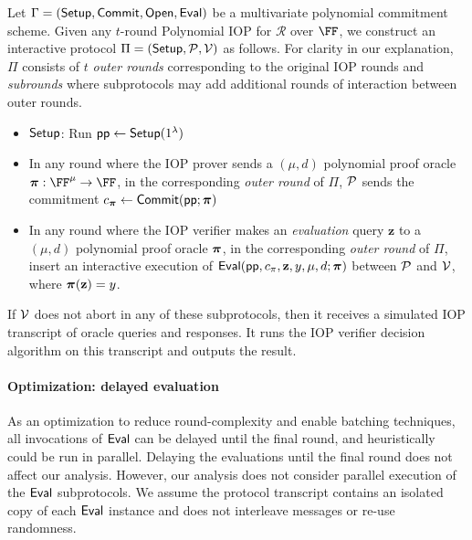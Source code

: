 Let $\Gamma = (\textsf{{Setup}}, \textsf{{Commit}}, \textsf{{Open}}, \textsf{{Eval}})$ be a multivariate polynomial commitment scheme. Given any $t$-round Polynomial IOP for $\mathcal{R}$ over $\FF$, we construct an interactive protocol $\Pi = (\textsf{{Setup}}, \mathcal{P}, \mathcal{V})$ as follows. For clarity in our explanation, $\Pi$ consists of $t$ \emph{outer rounds} corresponding to the original IOP rounds and \emph{subrounds} where subprotocols may add additional rounds of interaction between outer rounds.
\begin{itemize}
\item $\textsf{{Setup}}$: Run $\textsf{pp} \leftarrow \textsf{{Setup}}(1^\lambda)$
\item In any round where the IOP prover sends a $(\mu, d)$ polynomial proof oracle $\proofO: \FF^\mu \rightarrow \FF$, in the corresponding \emph{outer round} of $\Pi$, $\mathcal{P}$ sends the commitment $c_{\boldsymbol{\pi}} \leftarrow \textsf{{Commit}}(\textsf{pp}; \boldsymbol{\pi})$
\item In any round where the IOP verifier makes an \emph{evaluation} query $\mathbf{z}$ to a $(\mu, d)$ polynomial proof oracle $\boldsymbol{\pi}$, in the corresponding \emph{outer round} of $\Pi$, insert an interactive execution of $\textsf{{Eval}}(\textsf{pp}, c_\pi, \mathbf{z}, y, \mu, d; \boldsymbol{\pi})$ between $\mathcal{P}$ and $\mathcal{V}$, where $\boldsymbol{\pi}(\mathbf{z}) = y$. 
\end{itemize}

If $\mathcal{V}$ does not abort in any of these subprotocols, then it receives a simulated IOP transcript of oracle queries and responses. It runs the IOP verifier decision algorithm on this transcript and outputs the result.

\paragraph{Optimization: delayed evaluation} As an optimization to reduce round-complexity and enable batching techniques, all invocations of $\textsf{{Eval}}$ can be delayed until the final round, and heuristically could be run in parallel. Delaying the evaluations until the final round does not affect our analysis. However, our analysis does not consider parallel execution of the $\textsf{{Eval}}$ subprotocols. We assume the protocol transcript contains an isolated copy of each $\textsf{{Eval}}$ instance and does not interleave messages or re-use randomness.

